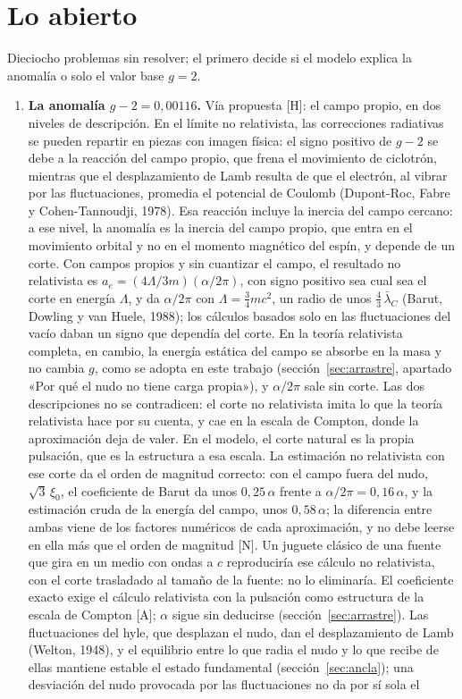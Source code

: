 \documentclass[11pt,a4paper]{article}
\newcommand{\st}[1]{\textup{[#1]}}
\newcommand{\lbar}{\bar{\lambda}}
\begin{document}
\section{Lo abierto}\label{sec:abierto}

Dieciocho problemas sin resolver; el primero decide si el modelo explica la anomalía o solo el valor base $g=2$.

\begin{enumerate}[label=\arabic*.,ref=\arabic*,leftmargin=*]

\item \label{ab:g2}\textbf{La anomalía $g-2=0,00116$.} Vía propuesta \st{H}: el campo propio, en dos niveles de descripción. En el límite no relativista, las correcciones radiativas se pueden repartir en piezas con imagen física: el signo positivo de $g-2$ se debe a la reacción del campo propio, que frena el movimiento de ciclotrón, mientras que el desplazamiento de Lamb resulta de que el electrón, al vibrar por las fluctuaciones, promedia el potencial de Coulomb (Dupont-Roc, Fabre y Cohen-Tannoudji, 1978). Esa reacción incluye la inercia del campo cercano: a ese nivel, la anomalía es la inercia del campo propio, que entra en el movimiento orbital y no en el momento magnético del espín, y depende de un corte. Con campos propios y sin cuantizar el campo, el resultado no relativista es $a_e=(4\Lambda/3m)(\alpha/2\pi)$, con signo positivo sea cual sea el corte en energía $\Lambda$, y da $\alpha/2\pi$ con $\Lambda=\tfrac34mc^2$, un radio de unos $\tfrac43\,\lbar_C$ (Barut, Dowling y van Huele, 1988); los cálculos basados solo en las fluctuaciones del vacío daban un signo que dependía del corte. En la teoría relativista completa, en cambio, la energía estática del campo se absorbe en la masa y no cambia $g$, como se adopta en este trabajo (sección~\ref{sec:arrastre}, apartado «Por qué el nudo no tiene carga propia»), y $\alpha/2\pi$ sale sin corte. Las dos descripciones no se contradicen: el corte no relativista imita lo que la teoría relativista hace por su cuenta, y cae en la escala de Compton, donde la aproximación deja de valer. En el modelo, el corte natural es la propia pulsación, que es la estructura a esa escala. La estimación no relativista con ese corte da el orden de magnitud correcto: con el campo fuera del nudo, $\sqrt3\,\xi_0$, el coeficiente de Barut da unos $0,25\,\alpha$ frente a $\alpha/2\pi=0,16\,\alpha$, y la estimación cruda de la energía del campo, unos $0,58\,\alpha$; la diferencia entre ambas viene de los factores numéricos de cada aproximación, y no debe leerse en ella más que el orden de magnitud \st{N}. Un juguete clásico de una fuente que gira en un medio con ondas a $c$ reproduciría ese cálculo no relativista, con el corte trasladado al tamaño de la fuente: no lo eliminaría. El coeficiente exacto exige el cálculo relativista con la pulsación como estructura de la escala de Compton \st{A}; $\alpha$ sigue sin deducirse (sección~\ref{sec:arrastre}). Las fluctuaciones del hyle, que desplazan el nudo, dan el desplazamiento de Lamb (Welton, 1948), y el equilibrio entre lo que radia el nudo y lo que recibe de ellas mantiene estable el estado fundamental (sección~\ref{sec:ancla}); una desviación del nudo provocada por las fluctuaciones no da por sí sola el 
\end{enumerate}
\end{document}
